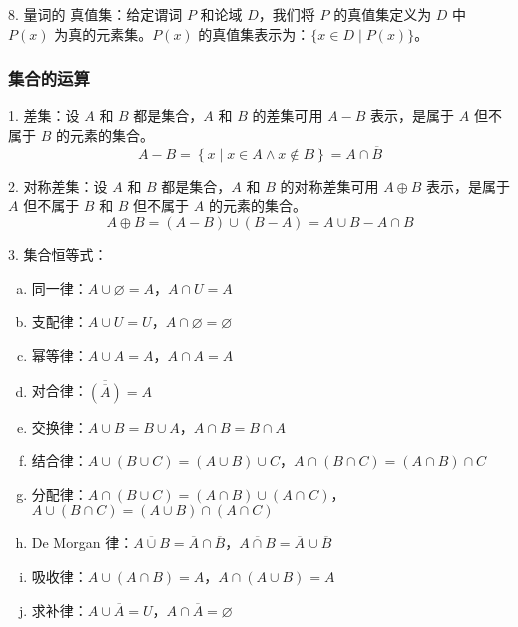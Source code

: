 \documentclass[normal,cyan]{elegantnote}
\begin{document}
8. 量词的   真值集：给定谓词 $P$ 和论域 $D$，我们将 $P$ 的真值集定义为 $D$ 中 $P(x)$ 为真的元素集。$P(x)$ 的真值集表示为：$\{x \in D \mid P(x)\}$。
\subsubsection{集合的运算}
1. 差集：设 $A$ 和 $B$ 都是集合，$A$ 和 $B$ 的差集可用 $A - B$ 表示，是属于 $A$ 但不属于 $B$ 的元素的集合。
$$A - B = \left\{x\mid x \in A \wedge x \notin B\right\} = A \cap \overline{B}$$

2. 对称差集：设 $A$ 和 $B$ 都是集合，$A$ 和 $B$ 的对称差集可用 $A \oplus B$ 表示，是属于 $A$ 但不属于 $B$ 和 $B$ 但不属于 $A$ 的元素的集合。
$$A \oplus B = (A - B) \cup (B - A) = A \cup B - A \cap B$$

3. 集合恒等式：
\begin{enumerate}[a)]
    \item 同一律：$A \cup \varnothing = A$，$A \cap U = A$
    \item 支配律：$A \cup U = U$，$A \cap \varnothing = \varnothing$
    \item 幂等律：$A \cup A = A$，$A \cap A = A$
    \item 对合律：$\overline{(\overline{A})} = A$
    \item 交换律：$A \cup B = B \cup A$，$A \cap B = B \cap A$
    \item 结合律：$A \cup (B \cup C) = (A \cup B) \cup C$，$A \cap (B \cap C) = (A \cap B) \cap C$
    \item 分配律：$A \cap (B \cup C) = (A \cap B) \cup (A \cap C)$，$A \cup (B \cap C) = (A \cup B) \cap (A \cap C)$
    \item De Morgan 律：$\overline{A \cup B} = \overline{A} \cap \overline{B}$，$\overline{A \cap B} = \overline{A} \cup \overline{B}$
    \item 吸收律：$A \cup (A \cap B) = A$，$A \cap (A \cup B) = A$
    \item 求补律：$A \cup \overline{A} = U$，$A \cap \overline{A} = \varnothing$
\end{enumerate}
\end{document}
